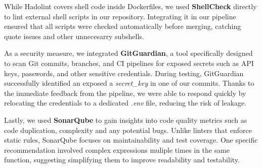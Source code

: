 While Hadolint covers shell code inside Dockerfiles, we used \textbf{ShellCheck} directly to lint external shell scripts in our repository. Integrating it in our pipeline ensured that all scripts were checked automatically before merging, catching quote issues and other unnecesarry subshells.

As a security measure, we integrated \textbf{GitGuardian}, a tool specifically designed to scan Git commits, branches, and CI pipelines for exposed secrets such as API keys, passwords, and other sensitive credentials. During testing, GitGuardian successfully identified an exposed a \textit{secret\_key} in one of our commits. Thanks to the immediate feedback from the pipeline, we were able to respond quickly by relocating the credentials to a dedicated \textit{.env} file, reducing the risk of leakage.

Lastly, we used \textbf{SonarQube} to gain insights into code quality metrics such as code duplication, complexity and any potential bugs. Unlike linters that enforce static rules, SonarQube focuses on maintainability and test coverage. One specific recommendation involved complex expressions muliple times in the same function, suggesting simplifying them to improve readability and testability.

